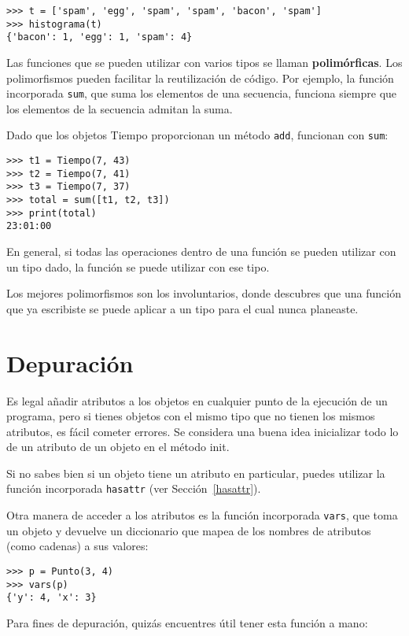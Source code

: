 \documentclass[10pt]{book}
\begin{document}
\begin{verbatim}
>>> t = ['spam', 'egg', 'spam', 'spam', 'bacon', 'spam']
>>> histograma(t)
{'bacon': 1, 'egg': 1, 'spam': 4}
\end{verbatim}
%
Las funciones que se pueden utilizar con varios tipos se llaman {\bf polimórficas}.
Los polimorfismos pueden facilitar la reutilización de código.  Por ejemplo, la función
incorporada {\tt sum}, que suma los elementos de una secuencia, funciona
siempre que los elementos de la secuencia admitan la suma.

Dado que los objetos Tiempo proporcionan un método {\tt add}, funcionan
con {\tt sum}:

\begin{verbatim}
>>> t1 = Tiempo(7, 43)
>>> t2 = Tiempo(7, 41)
>>> t3 = Tiempo(7, 37)
>>> total = sum([t1, t2, t3])
>>> print(total)
23:01:00
\end{verbatim}
%
En general, si todas las operaciones dentro de una función
se pueden utilizar con un tipo dado, la función se puede utilizar con ese tipo.

Los mejores polimorfismos son los involuntarios, donde
descubres que una función que ya escribiste se puede
aplicar a un tipo para el cual nunca planeaste.


\section{Depuración}

Es legal añadir atributos a los objetos en cualquier punto de la ejecución
de un programa, pero si tienes objetos con el mismo tipo que no
tienen los mismos atributos, es fácil cometer errores.
Se considera una buena idea
inicializar todo lo de un atributo de un objeto en el método init.

Si no sabes bien si un objeto tiene un atributo en particular,
puedes utilizar la función incorporada {\tt hasattr} (ver Sección~\ref{hasattr}).

Otra manera de acceder a los atributos es la función incorporada {\tt vars},
que toma un objeto y devuelve un diccionario que mapea de los nombres
de atributos (como cadenas) a sus valores:

\begin{verbatim}
>>> p = Punto(3, 4)
>>> vars(p)
{'y': 4, 'x': 3}
\end{verbatim}
%
Para fines de depuración, quizás encuentres útil tener esta
función a mano:
\end{document}
